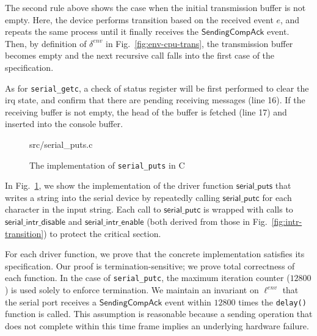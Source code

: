 The second rule above shows the case when the initial transmission buffer
is not empty. Here, the device performs transition based on
the received event $e$, and repeats the same process until it finally
receives the $\textsf{SendingCompAck}$ event. Then, by definition of
$\delta^{env}$ in Fig.~\ref{fig:env-cpu-trans}, the transmission
buffer becomes empty and the next recursive call falls into the first
case of the specification.

As for \texttt{serial\_getc}, a check of status register will be first performed
to clear the \textsf{irq} state, and confirm that there are pending receiving
messages (line 16). If the receiving buffer is not empty, the head of the buffer is
fetched (line 17) and inserted into the console buffer.

\begin{figure}
	 {src/serial_puts.c}
	\caption{The implementation of \texttt{serial\_puts} in C}
	\label{fig:serial_puts}
	\vspace{-10pt}
\end{figure}

In Fig.~\ref{fig:serial_puts}, we show the implementation of the
driver function $\textsf{serial\_puts}$ that writes a string into the
serial device by repeatedly calling $\textsf{serial\_putc}$ for each
character in the input string. Each call to $\textsf{serial\_putc}$ is
wrapped with calls to $\textsf{serial\_intr\_disable}$ and
$\textsf{serial\_intr\_enable}$ (both derived from those
in Fig.~\ref{fig:intr-transition}) to protect the critical section.

For each driver function, we prove
that the concrete implementation satisfies its specification. Our
proof is termination-sensitive; we prove total correctness of each
function. In the case of \texttt{serial\_putc}, the maximum iteration
counter ($12800$) is used solely to enforce termination. We maintain
an invariant on $\ell^{env}$ that the serial port receives a
$\textsf{SendingCompAck}$ event within $12800$ times the
\texttt{delay()} function is called. This assumption is reasonable
because a sending operation that does not complete within this
time frame implies an underlying hardware failure.


%
%


